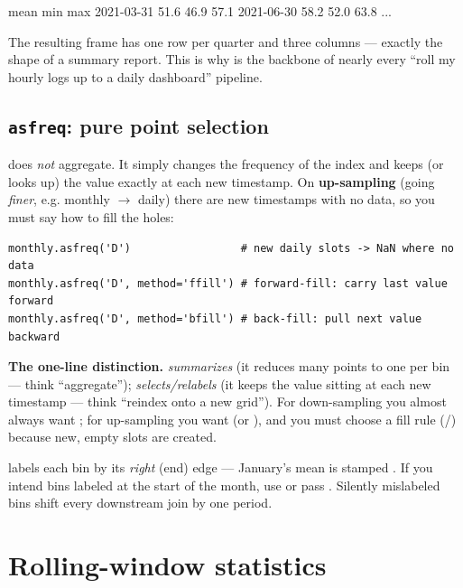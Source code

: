 \documentclass[11pt]{article}
\begin{document}
\begin{outblock}
                 mean    min    max
2021-03-31    51.6   46.9   57.1
2021-06-30    58.2   52.0   63.8
...
\end{outblock}

The resulting frame has one row per quarter and three columns --- exactly the shape of a summary report. This is why  is the backbone of nearly every ``roll my hourly logs up to a daily dashboard'' pipeline.

\subsection{\texttt{asfreq}: pure point selection}

 does \emph{not} aggregate. It simply changes the frequency of the index and keeps (or looks up) the value exactly at each new timestamp. On \textbf{up-sampling} (going \emph{finer}, e.g. monthly $\to$ daily) there are new timestamps with no data, so you must say how to fill the holes:

\begin{lstlisting}
monthly.asfreq('D')                 # new daily slots -> NaN where no data
monthly.asfreq('D', method='ffill') # forward-fill: carry last value forward
monthly.asfreq('D', method='bfill') # back-fill: pull next value backward
\end{lstlisting}

\begin{keyidea}
\textbf{The one-line distinction.}  \emph{summarizes} (it reduces many points to one per bin --- think ``aggregate'');  \emph{selects/relabels} (it keeps the value sitting at each new timestamp --- think ``reindex onto a new grid''). For down-sampling you almost always want ; for up-sampling you want  (or ), and you must choose a fill rule (/) because new, empty slots are created.
\end{keyidea}

\begin{pitfall}
 labels each bin by its \emph{right} (end) edge --- January's mean is stamped . If you intend bins labeled at the start of the month, use  or pass . Silently mislabeled bins shift every downstream join by one period.
\end{pitfall}

\section{Rolling-window statistics}
\end{document}
